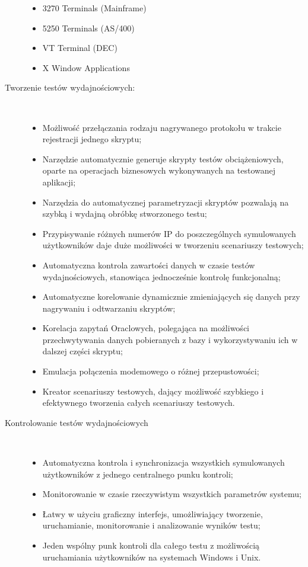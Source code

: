 \begin{description}
	\begin{itemize}
	\item 3270 Terminals (Mainframe)
	\item 5250 Terminals (AS/400)
	\item VT    Terminal   (DEC)
	\item X Window Applications
	\end{itemize}
\item[Tworzenie testów wydajnościowych:]\
	\begin{itemize}
	\item Możliwość przełączania rodzaju nagrywanego protokołu w trakcie rejestracji jednego skryptu;
	\item Narzędzie automatycznie generuje skrypty testów obciążeniowych, oparte na operacjach biznesowych wykonywanych na 
	testowanej aplikacji;
	\item Narzędzia do automatycznej parametryzacji skryptów pozwalają na szybką i wydajną obróbkę stworzonego testu;
	\item Przypisywanie różnych numerów IP do poszczególnych symulowanych użytkowników daje duże możliwości w tworzeniu 
	scenariuszy testowych;
	\item Automatyczna kontrola zawartości danych w czasie testów wydajnościowych, stanowiąca jednocześnie kontrolę funkcjonalną;
	\item Automatyczne korelowanie dynamicznie zmieniających się danych przy nagrywaniu i odtwarzaniu skryptów;
	\item Korelacja zapytań Oraclowych, polegająca na możliwości przechwytywania danych pobieranych z bazy i wykorzystywaniu ich w 
	dalszej części skryptu;
	\item Emulacja połączenia modemowego o różnej przepustowości;
	\item Kreator scenariuszy testowych, dający możliwość szybkiego i efektywnego tworzenia całych scenariuszy testowych.
	\end{itemize}

\item[Kontrolowanie testów wydajnościowych]\
	\begin{itemize}
	\item Automatyczna kontrola i synchronizacja wszystkich symulowanych użytkowników z jednego centralnego punku kontroli;
	\item Monitorowanie w czasie rzeczywistym wszystkich parametrów systemu;
	\item Łatwy w użyciu graficzny interfejs, umożliwiający tworzenie, uruchamianie, monitorowanie i analizowanie wyników testu;
	\item Jeden wspólny punk kontroli dla całego testu z możliwością uruchamiania użytkowników na systemach Windows i Unix.
	\end{itemize}


\end{description}

